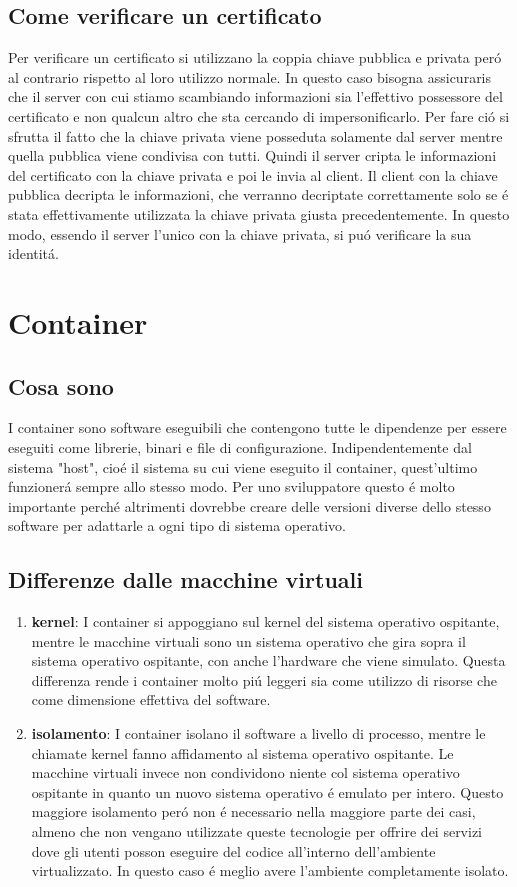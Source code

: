 \subsection{Come verificare un certificato}
Per verificare un certificato si utilizzano la coppia chiave pubblica e privata peró al contrario rispetto al loro utilizzo normale. In questo caso bisogna assicuraris che il server con cui stiamo scambiando informazioni sia l'effettivo possessore del certificato e non qualcun altro che sta cercando di impersonificarlo. Per fare ció si sfrutta il fatto che la chiave privata viene posseduta solamente dal server mentre quella pubblica viene condivisa con tutti. Quindi il server cripta le informazioni del certificato con la chiave privata e poi le invia al client. Il client con la chiave pubblica decripta le informazioni, che verranno decriptate correttamente solo se é stata effettivamente utilizzata la chiave privata giusta precedentemente. In questo modo, essendo il server l'unico con la chiave privata, si puó verificare la sua identitá.

\section{Container}
\subsection{Cosa sono}
\cite{container}I container sono software eseguibili che contengono tutte le dipendenze per essere eseguiti come librerie, binari e file di configurazione. Indipendentemente dal sistema "host", cioé il sistema su cui viene eseguito il container, quest'ultimo funzionerá sempre allo stesso modo. Per uno sviluppatore questo é molto importante perché altrimenti dovrebbe creare delle versioni diverse dello stesso software per adattarle a ogni tipo di sistema operativo.
\subsection{Differenze dalle macchine virtuali}
\begin{enumerate}
  \item \textbf{kernel}: I container si appoggiano sul kernel del sistema operativo ospitante, mentre le macchine virtuali sono un sistema operativo che gira sopra il sistema operativo ospitante, con anche l'hardware che viene simulato. Questa differenza rende i container molto piú leggeri sia come utilizzo di risorse che come dimensione effettiva del software.
  \item \textbf{isolamento}: I container isolano il software a livello di processo, mentre le chiamate kernel fanno affidamento al sistema operativo ospitante. Le macchine virtuali invece non condividono niente col sistema operativo ospitante in quanto un nuovo sistema operativo é emulato per intero. Questo maggiore isolamento peró non é necessario nella maggiore parte dei casi, almeno che non vengano utilizzate queste tecnologie per offrire dei servizi dove gli utenti posson eseguire del codice all'interno dell'ambiente virtualizzato. In questo caso é meglio avere l'ambiente completamente isolato.
\end{enumerate}

